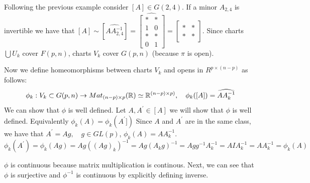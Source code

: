 \documentclass[11pt,a4paper]{report}
\begin{document}
\begin{Ex}
Following the previous example consider $ [A] \in G(2,4)$.
If a minor $A_{2,4}$ is invertible we have that
$
[A] \sim [\widehat{A A_{2,4}^{-1}}] = 
\widehat{\begin{bmatrix}
* & * \\
1 & 0 \\
* & * \\
0 & 1
\end{bmatrix}} = \begin{bmatrix}  * & * \\ * & * \end{bmatrix}
$.
Since charts $ \bigcup U_k$ cover $F(p,n)$, charts $V_k$ cover $G(p,n)$ (because $\pi$ is open).
\end{Ex}
Now we define homeomorphisms between charts $V_k$ and opens in $R^{p \times (n-p)}$ as follows:
$$ \phi_{k}: V_{k} \subset G(p,n) \to Mat_{ (n-p) \times p} (\mathbb{R}) \simeq \mathbb{R}^{ (n-p) \times p) }, \quad \phi_{k}([A]) = \widehat{A A_{k}^{-1}} $$
We can show that $\phi$ is well defined. 
\newline
Let $A, A^\prime \in [A]$ we will show that $\phi$ is well defined. Equivalently $\phi_{k}(A) = \phi_{k}(A^\prime])$
Since $A$ and $A^\prime$ are in the same class, we have that $A^\prime = A g, \quad g \in GL(p) $, $\phi_{k}(A) = A A_{k}^{-1}$.
$$ \phi_{k}(A^\prime) = \phi_{k}(A g) = Ag ((Ag)_{k})^{-1} = Ag( A_{k} g )^{-1} = A g g^{-1} A_{k}^{-1} = A I A_{k}^{-1} = A A_{k}^{-1} = \phi_{k}(A) $$

$\phi$ is continuous because matrix multiplication is continous. Next, we can see that $\phi$ is surjective and $\phi^{-1}$ is continuous by explicitly defining inverse.
\end{document}
